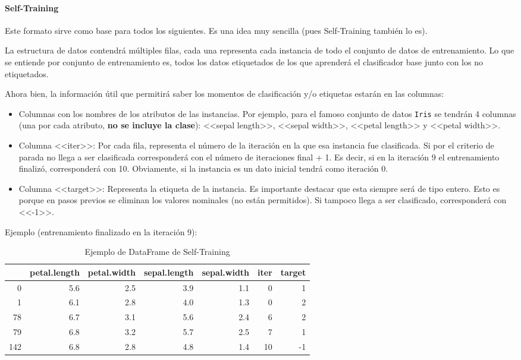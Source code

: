 \paragraph{Self-Training}
Este formato sirve como base para todos los siguientes. Es una idea muy sencilla
(pues Self-Training también lo es). 

La estructura de datos contendrá múltiples filas, cada una representa cada
instancia de todo el conjunto de datos de entrenamiento. Lo que se entiende por
conjunto de entrenamiento es, todos los datos etiquetados de los que aprenderá
el clasificador base junto con los no etiquetados.

Ahora bien, la información útil que permitirá saber los momentos de
clasificación y/o etiquetas estarán en las columnas:

\begin{itemize}
    \item Columnas con los nombres de los atributos de las instancias. Por
    ejemplo, para el famoso conjunto de datos \texttt{Iris} se tendrán 4
    columnas (una por cada atributo, \textbf{no se incluye la clase}): <<sepal
    length>>, <<sepal width>>, <<petal length>> y <<petal width>>.
    \item Columna <<iter>>: Por cada fila, representa el número de la iteración
    en la que esa instancia fue clasificada. Si por el criterio de parada no
    llega a ser clasificada corresponderá con el número de iteraciones final +
    1. Es decir, si en la iteración 9 el entrenamiento finalizó, corresponderá
    con 10. Obviamente, si la instancia es un dato inicial tendrá como iteración
    0.
    \item Columna <<target>>: Representa la etiqueta de la instancia. Es
    importante destacar que esta siempre será de tipo entero. Esto es porque en
    pasos previos se eliminan los valores nominales (no están permitidos). Si
    tampoco llega a ser clasificado, corresponderá con <<-1>>.
\end{itemize}

Ejemplo (entrenamiento finalizado en la iteración 9):
\begin{table}[H]
\begin{tabular}{rrrrrrr}
    & petal.length & petal.width & sepal.length & sepal.width & iter & target \\ \toprule
0   & 5.6          & 2.5         & 3.9          & 1.1         & 0    & 1      \\
1   & 6.1          & 2.8         & 4.0          & 1.3         & 0    & 2      \\
78  & 6.7          & 3.1         & 5.6          & 2.4         & 6    & 2      \\
79  & 6.8          & 3.2         & 5.7          & 2.5         & 7    & 1      \\
142 & 6.8          & 2.8         & 4.8          & 1.4         & 10   & -1    
\end{tabular}
\caption{Ejemplo de DataFrame de Self-Training}
\end{table}

